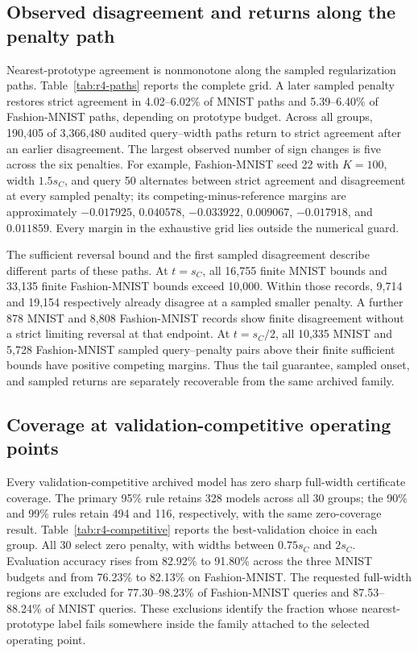 \subsection{Observed disagreement and returns along the penalty path}
\label{sec:r4-path-results}
Nearest-prototype agreement is nonmonotone along the sampled regularization paths. Table~\ref{tab:r4-paths} reports the complete grid. A later sampled penalty restores strict agreement in 4.02--6.02\% of MNIST paths and 5.39--6.40\% of Fashion-MNIST paths, depending on prototype budget. Across all groups, 190,405 of 3,366,480 audited query--width paths return to strict agreement after an earlier disagreement. The largest observed number of sign changes is five across the six penalties. For example, Fashion-MNIST seed 22 with $K=100$, width $1.5s_C$, and query 50 alternates between strict agreement and disagreement at every sampled penalty; its competing-minus-reference margins are approximately $-0.017925$, $0.040578$, $-0.033922$, $0.009067$, $-0.017918$, and $0.011859$. Every margin in the exhaustive grid lies outside the numerical guard.



The sufficient reversal bound and the first sampled disagreement describe different parts of these paths. At $t=s_C$, all 16,755 finite MNIST bounds and 33,135 finite Fashion-MNIST bounds exceed 10,000. Within those records, 9,714 and 19,154 respectively already disagree at a sampled smaller penalty. A further 878 MNIST and 8,808 Fashion-MNIST records show finite disagreement without a strict limiting reversal at that endpoint. At $t=s_C/2$, all 10,335 MNIST and 5,728 Fashion-MNIST sampled query--penalty pairs above their finite sufficient bounds have positive competing margins. Thus the tail guarantee, sampled onset, and sampled returns are separately recoverable from the same archived family.

\subsection{Coverage at validation-competitive operating points}
\label{sec:r4-competitive-results}
Every validation-competitive archived model has zero sharp full-width certificate coverage. The primary 95\% rule retains 328 models across all 30 groups; the 90\% and 99\% rules retain 494 and 116, respectively, with the same zero-coverage result. Table~\ref{tab:r4-competitive} reports the best-validation choice in each group. All 30 select zero penalty, with widths between $0.75s_C$ and $2s_C$. Evaluation accuracy rises from 82.92\% to 91.80\% across the three MNIST budgets and from 76.23\% to 82.13\% on Fashion-MNIST. The requested full-width regions are excluded for 77.30--98.23\% of Fashion-MNIST queries and 87.53--88.24\% of MNIST queries. These exclusions identify the fraction whose nearest-prototype label fails somewhere inside the family attached to the selected operating point.

